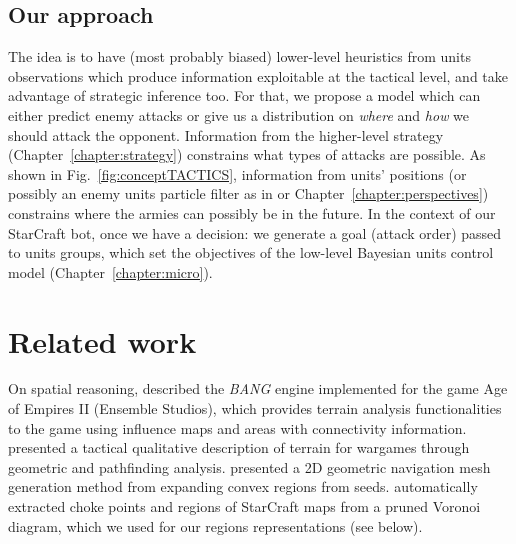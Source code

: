 \subsection{Our approach}
The idea is to have (most probably biased) lower-level heuristics from units observations which produce information exploitable at the tactical level, and take advantage of strategic inference too. 
For that, we propose a model which can either predict enemy attacks or give us a distribution on \textit{where} and \textit{how} we should attack the opponent. Information from the higher-level strategy \citep{SYNNAEVE:StratPred,SYNNAEVE:OpeningPred} (Chapter~\ref{chapter:strategy}) constrains what types of attacks are possible. As shown in Fig.~\ref{fig:conceptTACTICS}, information from units' positions (or possibly an enemy units particle filter as in \citep{weber2011aiide} or Chapter~\ref{chapter:perspectives}) constrains where the armies can possibly be in the future. In the context of our StarCraft bot, once we have a decision: we generate a goal (attack order) passed to units groups, which set the objectives of the low-level Bayesian units control model \citep{SYNNAEVE:Micro} (Chapter~\ref{chapter:micro}).



\section{Related work}

On spatial reasoning, \cite{Pottinger00} described the \textit{BANG} engine implemented for the game Age of Empires II (Ensemble Studios), which provides terrain analysis functionalities to the game using influence maps and areas with connectivity information. 
\cite{Forbus2002} presented a tactical qualitative description of terrain for wargames through geometric and pathfinding analysis. \cite{Hale08} presented a 2D geometric navigation mesh generation method from expanding convex regions from seeds. \cite{Perkins2010} automatically extracted choke points and regions of StarCraft maps from a pruned Voronoi diagram, which we used for our regions representations (see below). 

